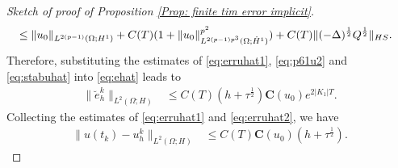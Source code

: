 \documentclass[reqno, 11pt]{amsart}
\theoremstyle{plain}
\theoremstyle{definition}
\theoremstyle{remark}
\numberwithin{equation}{section}
\numberwithin{theorem}{section}
\newcommand{\con}{\mathbf{C}}
\begin{document}
{\begin{proof}[Sketch of proof of Proposition \ref{Prop: finite tim error implicit}]
\begin{align}
&\leq \|u_0\|_{L^{2(p-1)}(\Omega;H^1)}+C(T)(1+\|u_0\|_{L^{2(p-1)p^3}(\Omega; \dot{H}^1)}^{p^2})+C(T)\|(-\Delta)^{\frac{1}{2}}Q^{\frac{1}{2}}\|_{HS}. \notag
\end{align}
Therefore, substituting the estimates of \eqref{eq:erruhat1}, \eqref{eq:p61u2} and \eqref{eq:stabuhat} into \eqref{eq:ehat} leads to
\begin{align}\label{eq:erruhat2}
\|\breve{e}_h^k\|_{L^2(\Omega;H)}&\leq C(T)(h+\tau^{\frac{1}{2}}) \con(u_0) e^{2|K_1|T}.
\end{align}
Collecting the estimates of \eqref{eq:erruhat1} and \eqref{eq:erruhat2}, we have
\begin{align}
\|u(t_k)-u_h^k\|_{L^2(\Omega;H)}&\leq C(T) \con(u_0)(h+\tau^{\frac{1}{2}}).
\end{align}
\end{proof}

}
\end{document}
